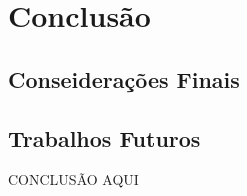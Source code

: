 \chapter{Conclusão} \label{cap6}
\section{Conseiderações Finais}
\section{Trabalhos Futuros}
CONCLUSÃO AQUI

